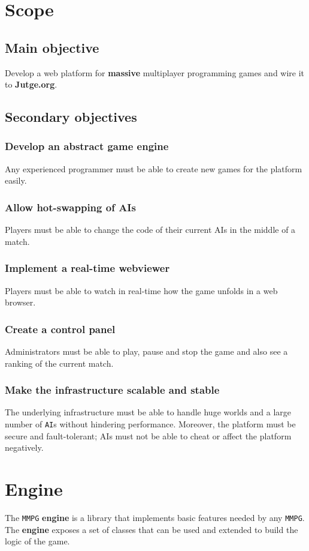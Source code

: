 \documentclass[a4paper,11pt,titlepage,abstract,numbers=noenddot,automark,mnsy,intlimits,rgb,dvipsnames]{report}
\begin{document}
\chapter{Scope}
\section{Main objective}
Develop a web platform for \textbf{massive} multiplayer programming games and wire it to \textbf{Jutge.org}.
\section{Secondary objectives}
\subsection{Develop an abstract game engine}
Any experienced programmer must be able to create new games for the platform easily.
\subsection{Allow hot-swapping of AIs}
Players must be able to change the code of their current AIs in the middle of a match.
\subsection{Implement a real-time webviewer}
Players must be able to watch in real-time how the game unfolds in a web browser.
\subsection{Create a control panel}
Administrators must be able to play, pause and stop the game and also see a ranking of the current match.
\subsection{Make the infrastructure scalable and stable}
The underlying infrastructure must be able to handle huge worlds and a large number of \texttt{AI}s without
hindering performance. Moreover, the platform must be secure and fault-tolerant; AIs must not be able to cheat
or affect the platform negatively.
\clearpage
\chapter{Engine}
The \texttt{MMPG} \textbf{engine} is a library that implements basic features needed by any \texttt{MMPG}. The \textbf{engine} exposes a set
of classes that can be used and extended to build the logic of the game.
\end{document}
